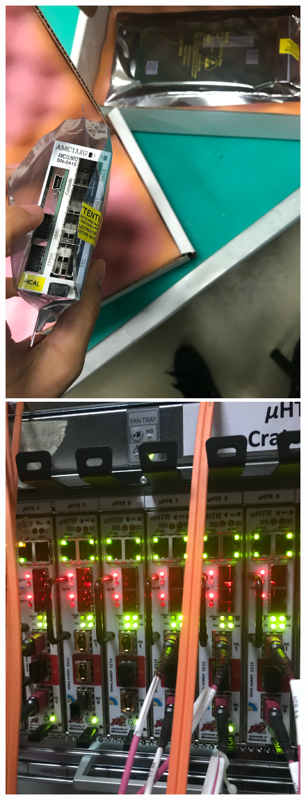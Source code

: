 \begin{figure}[!htb]
	\centering
	\includegraphics[scale=0.07]{fig/AMC13Reprogramming.jpg}
 \includegraphics[scale=0.07]{fig/904BE.jpg}

\end{figure}
